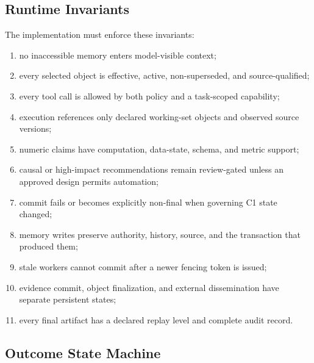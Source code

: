 \documentclass[10pt]{article}
\begin{document}
\subsection{Runtime Invariants}

The implementation must enforce these invariants:
\begin{enumerate}
  \item no inaccessible memory enters model-visible context;
  \item every selected object is effective, active, non-superseded, and source-qualified;
  \item every tool call is allowed by both policy and a task-scoped capability;
  \item execution references only declared working-set objects and observed source versions;
  \item numeric claims have computation, data-state, schema, and metric support;
  \item causal or high-impact recommendations remain review-gated unless an approved design permits automation;
  \item commit fails or becomes explicitly non-final when governing C1 state changed;
  \item memory writes preserve authority, history, source, and the transaction that produced them;
  \item stale workers cannot commit after a newer fencing token is issued;
  \item evidence commit, object finalization, and external dissemination have separate persistent states;
  \item every final artifact has a declared replay level and complete audit record.
\end{enumerate}

\subsection{Outcome State Machine}
\end{document}
